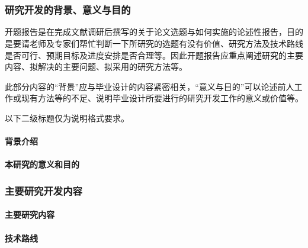 \part{} %
\label{prt:开题报告_}
	\setcounter{section}{0}
	\section{研究开发的背景、意义与目的} %
	\label{sec:研究开发的背景_意义与目的}
		开题报告是在完成文献调研后撰写的关于论文选题与如何实施的论述性报告，目的是要请老师及专家们帮忙判断一下所研究的选题有没有价值、研究方法及技术路线是否可行、预期目标及进度安排是否合理等。因此开题报告应重点阐述研究的主要内容、拟解决的主要问题、拟采用的研究方法等。

		此部分内容的“背景”应与毕业设计的内容紧密相关，“意义与目的”可以论述前人工作或现有方法等的不足、说明毕业设计所要进行的研究开发工作的意义或价值等。

		以下二级标题仅为说明格式要求。

		\subsection{背景介绍} %
		\label{sub:背景介绍}
		
		\subsection{本研究的意义和目的} %
		\label{sub:本研究的意义和目的}
		
	\newpage
	\section{主要研究开发内容} %
	\label{sec:主要研究开发内容}
		\subsection{主要研究内容} %
		\label{sub:主要研究内容}
		
		\subsection{技术路线} %
		\label{sub:技术路线}
		

